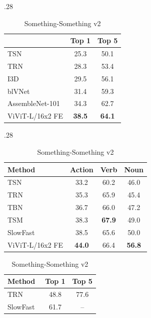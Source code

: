 \begin{table}[tb]
\begin{subtable}[t]{.28\linewidth}
{\begin{tabular}{lcc}
  				\toprule
  				& Top 1 & Top 5 \\ 
  				\midrule
  				TSN~\cite{wang_tsn_eccv_2016}				& 25.3		 &  50.1	\\
  				TRN~\cite{zhou_trn_eccv_2018}				 & 28.3		 &  53.4	 \\
  				I3D~\cite{carreira_cvpr_2017}					& 29.5		&  56.1		\\
  				blVNet~\cite{fan_blvnet_neurips_2019}	 &  31.4	 &  59.3 	 \\
  				AssembleNet-101~\cite{ryoo_iclr_2020} 	&  34.3     &  62.7     \\
  				\midrule
  				ViViT-L/16x2 FE 	& \textbf{38.5} & \textbf{64.1} \\  %
  				\bottomrule
  			\end{tabular}
  			\label{tab:sota_moments_in_time}
  		}
  	\end{subtable}
  	\hfill
  	\begin{subtable}[t]{.28\linewidth}
  		\caption{Epic Kitchens 100 Top 1 accuracy}
  		\setlength{\tabcolsep}{4pt} %
  		\vspace{-0.3\baselineskip}
		\scriptsize{
			\begin{tabular}{lccc}
				\toprule
				Method 													 & Action & Verb  & Noun  \\
				\midrule
				TSN~\cite{wang_tsn_eccv_2016}		 		&  33.2 & 60.2 & 46.0  \\
				TRN~\cite{zhou_trn_eccv_2018} 				& 35.3 & 65.9 & 45.4   \\
				TBN~\cite{kazakos_iccv_2019}				 & 36.7 & 66.0 & 47.2    \\
				TSM~\cite{lin_tsm_cvpr_2019} 				 & 38.3 & \textbf{67.9} & 49.0  \\
				SlowFast~\cite{feichtenhofer_iccv_2019}  & 38.5 & 65.6 & 50.0  \\
				\midrule
				ViViT-L/16x2 FE & \textbf{44.0} & 66.4 & \textbf{56.8} \\ %
				\bottomrule
			\end{tabular}
		}
		\label{tab:sota_epic_kitchens}
		\vspace{0.4\baselineskip}
		\centering
		\caption{Something-Something v2}
		\setlength{\tabcolsep}{6pt} %
		\scriptsize{
			\begin{tabular}{lcc}
				\toprule
				Method 												  & Top 1                & Top 5   \\
				\midrule
				TRN~\cite{zhou_trn_eccv_2018}										& 48.8 & 77.6 \\
				SlowFast~\cite{feichtenhofer_cvpr_2020,wu_multigrid_cvpr_2020}		& 61.7 & --    \\

\end{tabular}}
\end{subtable}
\end{table}
